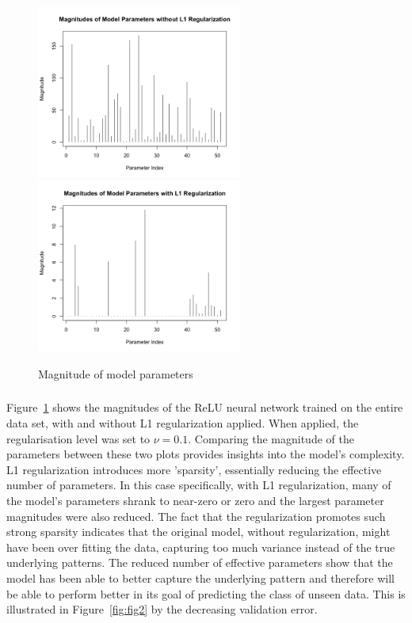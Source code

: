 \documentclass[12pt]{article}
\begin{document}
\begin{figure}[h]
\centering
\includegraphics[width=0.6\textwidth]{question_e_plot_B.png}
\includegraphics[width=0.6\textwidth]{question_e_plot_A.png}
\caption{Magnitude of model parameters}
\label{fig:fig3}
\end{figure}

\subsubsection{}
 Figure~\ref{fig:fig3} shows the magnitudes of the ReLU neural network trained on the entire data set, with and without L1 regularization applied. When applied, the regularisation level was set to \( \nu = 0.1 \). Comparing the magnitude of the parameters between these two plots provides insights into the model's complexity. L1 regularization introduces more 'sparsity', essentially reducing the effective number of parameters. In this case specifically, with L1 regularization, many of the model's parameters shrank to near-zero or zero and the largest parameter magnitudes were also reduced. The fact that the regularization promotes such strong sparsity indicates that the original model, without regularization, might have been over fitting the data, capturing too much variance instead of the true underlying patterns. The reduced number of effective parameters show that the model has been able to better capture the underlying pattern and therefore will be able to perform better in its goal of predicting the class of unseen data. This is illustrated in Figure~\ref{fig:fig2} by the decreasing validation error.
\end{document}
